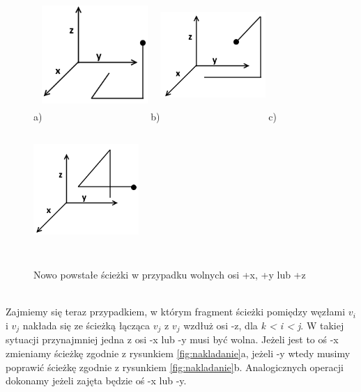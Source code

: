 \documentclass[brudnopis]{xmgr}
\begin{document}
\begin{figure}[ht!]
  \centering
  a)\includegraphics[width=4cm,height=5cm]{rysunki/wolne_x.png}
  b)\includegraphics[width=4cm,height=5cm]{rysunki/wolne_y.png}
  c)\includegraphics[width=4cm,height=5cm]{rysunki/wolne_z.png}
  \caption{Nowo powstałe ścieżki w przypadku wolnych osi +x, +y lub +z}
  \label{fig:nowe sciezki}
\end{figure} 
\\\indent Zajmiemy się teraz przypadkiem, w którym fragment ścieżki pomiędzy węzłami $v_i$ i $v_j$ nakłada się ze ścieżką łącząca $v_j$ z $v_j$ wzdłuż osi -z, dla \textit{k < i < j}. W takiej sytuacji przynajmniej jedna z osi -x lub -y musi być wolna. Jeżeli jest to oś -x zmieniamy ścieżkę zgodnie z rysunkiem \ref{fig:nakladanie}a, jeżeli -y wtedy musimy poprawić ścieżkę zgodnie z rysunkiem \ref{fig:nakladanie}b. Analogicznych operacji dokonamy jeżeli zajęta będzie oś -x lub -y.
\end{document}
